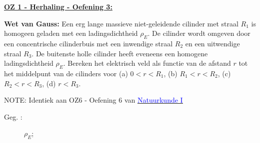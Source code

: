\textbf{\underline{OZ 1 - Herhaling - Oefening 3:}}
\vspace{0.5cm}

\textbf{Wet van Gauss:} Een erg lange massieve niet-geleidende cilinder met straal $ R_1 $ is homogeen geladen met een ladingsdichtheid $ \rho_E $. De cilinder wordt omgeven door een concentrische cilinderbuis met een inwendige straal $ R_2 $ en een uitwendige straal $ R_3 $. De buitenste holle cilinder heeft eveneens een homogene ladingsdichtheid $ \rho_E $. Bereken het elektrisch veld als functie van de afstand $ r $ tot het middelpunt van de cilinders voor (a) $ 0 < r < R_1 $, (b) $ R_1 < r < R_2 $, (c) $ R_2 < r < R_3 $, (d) $ r < R_3 $.

\vspace{0.5cm}

NOTE: Identiek aan OZ6 - Oefening 6 van \href{https://www.overleaf.com/project/6252f4fc1fe198443959eb75#section*.39}{\underline{\textcolor{blue}{Natuurkunde I}}}

\begin{description}
    \item[Geg. :]   $ \rho_E $;
\end{description}

